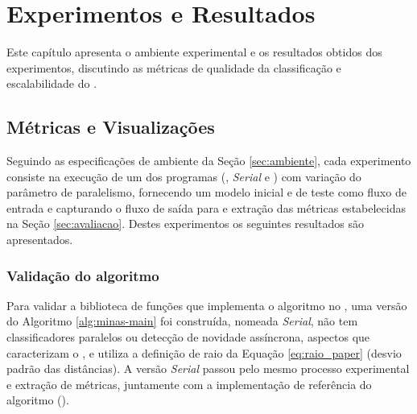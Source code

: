 


% 
% 

\chapter{Experimentos e Resultados}\label{cha:results}

Este capítulo apresenta o ambiente experimental e os resultados obtidos dos
experimentos, discutindo as métricas de qualidade da classificação e
escalabilidade do \mfog.


% 

\section{Métricas e Visualizações}
\label{sec:experiments}

\newcommand{\serial}{\textit{Serial}\xspace}

Seguindo as especificações de ambiente da Seção \ref{sec:ambiente}, cada
experimento consiste na execução de um dos programas (, \serial e
\mfog) com variação do parâmetro de paralelismo, fornecendo um modelo inicial e
\dataset de teste como fluxo de entrada e capturando o fluxo de saída para e
extração das métricas estabelecidas na Seção \ref{sec:avaliacao}.
Destes experimentos os seguintes resultados são apresentados.

\subsection{Validação do algoritmo}

Para validar a biblioteca de funções que implementa o algoritmo \minas no \mfog,
uma versão do Algoritmo \ref{alg:minas-main} foi construída, nomeada \serial,
não tem classificadores paralelos ou detecção de novidade assíncrona, aspectos
que caracterizam o \mfog, e utiliza a definição de raio da Equação \ref{eq:raio_paper} (desvio padrão das distâncias).
A versão \serial passou pelo mesmo processo experimental e extração de métricas,
juntamente com a implementação de referência do algoritmo \minas ().

